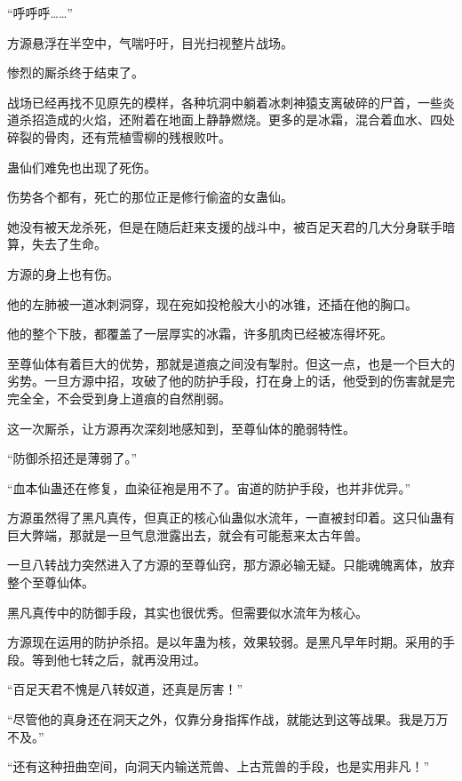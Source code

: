 
\begin{this_body}

“呼呼呼……”

方源悬浮在半空中，气喘吁吁，目光扫视整片战场。

惨烈的厮杀终于结束了。

战场已经再找不见原先的模样，各种坑洞中躺着冰刺神猿支离破碎的尸首，一些炎道杀招造成的火焰，还附着在地面上静静燃烧。更多的是冰霜，混合着血水、四处碎裂的骨肉，还有荒植雪柳的残根败叶。

蛊仙们难免也出现了死伤。

伤势各个都有，死亡的那位正是修行偷盗的女蛊仙。

她没有被天龙杀死，但是在随后赶来支援的战斗中，被百足天君的几大分身联手暗算，失去了生命。

方源的身上也有伤。

他的左肺被一道冰刺洞穿，现在宛如投枪般大小的冰锥，还插在他的胸口。

他的整个下肢，都覆盖了一层厚实的冰霜，许多肌肉已经被冻得坏死。

至尊仙体有着巨大的优势，那就是道痕之间没有掣肘。但这一点，也是一个巨大的劣势。一旦方源中招，攻破了他的防护手段，打在身上的话，他受到的伤害就是完完全全，不会受到身上道痕的自然削弱。

这一次厮杀，让方源再次深刻地感知到，至尊仙体的脆弱特性。

“防御杀招还是薄弱了。”

“血本仙蛊还在修复，血染征袍是用不了。宙道的防护手段，也并非优异。”

方源虽然得了黑凡真传，但真正的核心仙蛊似水流年，一直被封印着。这只仙蛊有巨大弊端，那就是一旦气息泄露出去，就会有可能惹来太古年兽。

一旦八转战力突然进入了方源的至尊仙窍，那方源必输无疑。只能魂魄离体，放弃整个至尊仙体。

黑凡真传中的防御手段，其实也很优秀。但需要似水流年为核心。

方源现在运用的防护杀招。是以年蛊为核，效果较弱。是黑凡早年时期。采用的手段。等到他七转之后，就再没用过。

“百足天君不愧是八转奴道，还真是厉害！”

“尽管他的真身还在洞天之外，仅靠分身指挥作战，就能达到这等战果。我是万万不及。”

“还有这种扭曲空间，向洞天内输送荒兽、上古荒兽的手段，也是实用非凡！”


\end{this_body}
